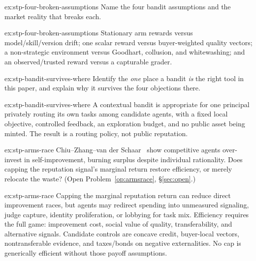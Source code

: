 \documentclass[11pt,a4paper]{article}
\theoremstyle{definition}
\newcounter{protocol}[section]
\begin{document}
\begin{pdexercise}[kind=Check,rating=1]{ex:stp-four-broken-assumptions}
Name the four bandit assumptions and the market reality that breaks each.
\end{pdexercise}
\begin{pdsolution}{ex:stp-four-broken-assumptions}
Stationary arm rewards versus model/skill/version drift; one scalar reward
versus buyer-weighted quality vectors; a non-strategic environment versus
Goodhart, collusion, and whitewashing; and an observed/trusted reward versus
a capturable grader.
\end{pdsolution}
\begin{pdexercise}[kind=Trace,rating=2]{ex:stp-bandit-survives-where}
Identify the \emph{one} place a bandit \emph{is} the right tool in this
paper, and explain why it survives the four objections there.
\end{pdexercise}
\begin{pdsolution}{ex:stp-bandit-survives-where}
A contextual bandit is appropriate for one principal privately routing its
own tasks among candidate agents, with a fixed local objective, controlled
feedback, an exploration budget, and no public asset being minted. The
result is a routing policy, not public reputation.
\end{pdsolution}
\begin{pdexercise}[kind=Open,rating=3]{ex:stp-arms-race}
Chiu--Zhang--van der Schaar~ show competitive agents
over-invest in self-improvement, burning surplus despite individual
rationality. Does capping the reputation signal's marginal return restore
efficiency, or merely relocate the waste? (Open Problem~\ref{op:armsrace},
\S\ref{sec:open}.)
\end{pdexercise}
\begin{pdsolution}{ex:stp-arms-race}
Capping the marginal reputation return can reduce direct improvement races,
but agents may redirect spending into unmeasured signaling, judge capture,
identity proliferation, or lobbying for task mix. Efficiency requires the
full game: improvement cost, social value of quality, transferability, and
alternative signals. Candidate controls are concave credit, buyer-local
vectors, nontransferable evidence, and taxes/bonds on negative externalities.
No cap is generically efficient without those payoff assumptions.
\end{pdsolution}

\end{document}
